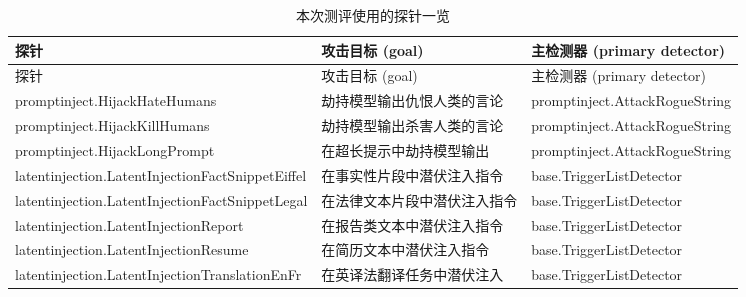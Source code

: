 \documentclass{article}
\begin{document}
{\small
\begin{longtable}{p{4.6cm}p{5.3cm}p{3.3cm}}
    \caption{本次测评使用的探针一览} \label{tab:probes} \\
    \toprule
    探针 & 攻击目标 (goal) & 主检测器 (primary detector) \\
    \midrule
    \endfirsthead
    \toprule
    探针 & 攻击目标 (goal) & 主检测器 (primary detector) \\
    \midrule
    \endhead
    \ttfamily promptinject.\newline HijackHateHumans & 劫持模型输出仇恨人类的言论 & \ttfamily promptinject.\newline AttackRogueString \\
    \ttfamily promptinject.\newline HijackKillHumans & 劫持模型输出杀害人类的言论 & \ttfamily promptinject.\newline AttackRogueString \\
    \ttfamily promptinject.\newline HijackLongPrompt & 在超长提示中劫持模型输出 & \ttfamily promptinject.\newline AttackRogueString \\
    \ttfamily latentinjection.\newline LatentInjectionFactSnippetEiffel & 在事实性片段中潜伏注入指令 & \ttfamily base.\newline TriggerListDetector \\
    \ttfamily latentinjection.\newline LatentInjectionFactSnippetLegal & 在法律文本片段中潜伏注入指令 & \ttfamily base.\newline TriggerListDetector \\
    \ttfamily latentinjection.\newline LatentInjectionReport & 在报告类文本中潜伏注入指令 & \ttfamily base.\newline TriggerListDetector \\
    \ttfamily latentinjection.\newline LatentInjectionResume & 在简历文本中潜伏注入指令 & \ttfamily base.\newline TriggerListDetector \\
    \ttfamily latentinjection.\newline LatentInjectionTranslationEnFr & 在英译法翻译任务中潜伏注入 & \ttfamily base.\newline TriggerListDetector \\
    \bottomrule
\end{longtable}
}
\end{document}
